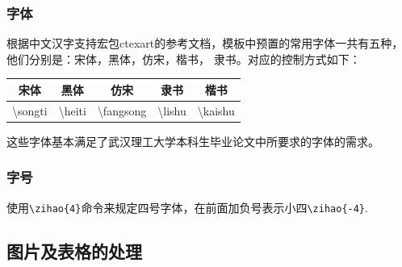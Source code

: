 \subsubsection{字体}
根据中文汉字支持宏包ctexart的参考文档，模板中预置的常用字体一共有五种，他们分别是：宋体，黑体，仿宋，楷书， 隶书。对应的控制方式如下：
\begin{center}
\begin{tabular}{ccccc}
\hline \rule[-2ex]{0pt}{5.5ex} { 宋体} & { 黑体} & { 仿宋} & { 隶书} & {楷书} \\ 
\hline \rule[-2ex]{0pt}{5.5ex} \textbackslash songti &\textbackslash  heiti  & \textbackslash fangsong & \textbackslash lishu & \textbackslash kaishu \\ 
\hline 
\end{tabular}  
\end{center}
这些字体基本满足了武汉理工大学本科生毕业论文中所要求的字体的需求。


\subsubsection{字号}
使用\verb|\zihao{4}|命令来规定四号字体，在前面加负号表示小四\verb|\zihao{-4}|.
\subsection{图片及表格的处理}

